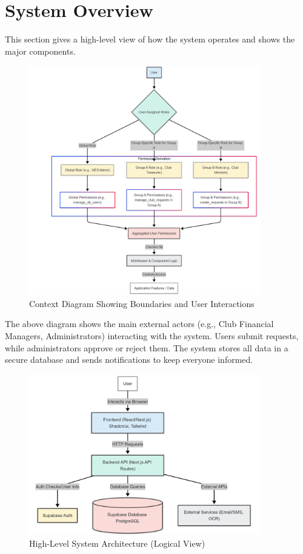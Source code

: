 \documentclass[12pt]{article}
\begin{document}
\section{System Overview}
This section gives a high-level view of how the system operates and shows the major components.

\begin{figure}[h!]
  \centering
  \includegraphics[width=0.9\textwidth]{system_detail.png}
  \caption{Context Diagram Showing Boundaries and User Interactions}
  \label{fig:detailed-architecture}
\end{figure}

The above diagram shows the main external actors (e.g., Club Financial Managers, Administrators) interacting with the system. Users submit requests, while administrators approve or reject them. The system stores all data in a secure database and sends notifications to keep everyone informed.

\begin{figure}[h!]
  \centering
  \includegraphics[width=0.9\textwidth]{stack.png}
  \caption{High-Level System Architecture (Logical View)}
  \label{fig:stack-architecture}
\end{figure}
\end{document}
